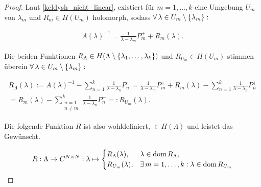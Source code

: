 \begin{proof}

    Laut \ref{keldysh_nicht_linear}, existiert für $m = 1, \dots, k$ eine Umgebung $U_m$ von $\lambda_m$ und $R_m \in H(U_m)$ holomorph, sodass $\forall \, \lambda \in U_m \setminus {\left \{ \lambda_m \right \}}:$

    \begin{align*}
        A(\lambda)^{-1}
        =
        \frac{1}{\lambda - \lambda_m} P_m^+
        +
        R_m(\lambda).
    \end{align*}

    Die beiden Funktionen $R_\Lambda \in H(\Lambda \setminus {\left \{ \lambda_1, \dots, \lambda_k \right \}})$ und $R_{U_m} \in H(U_m)$ stimmen überein $\forall \, \lambda \in U_m \setminus {\left \{ \lambda_m \right \}}:$

    \begin{multline*}
        R_\Lambda(\lambda)
        :=
        A(\lambda)^{-1}
        -
        \sum_{n=1}^k
            \frac{1}{\lambda - \lambda_n} P_n^+
        =
        \frac{1}{\lambda - \lambda_m} P_m^+
        +
        R_m(\lambda)
        -
        \sum_{n=1}^k
            \frac{1}{\lambda - \lambda_n} P_n^+ \\
        =
        R_m(\lambda)
        -
        \sum_{\substack{n = 1 \\ n \neq m}}^k
            \frac{1}{\lambda - \lambda_n} P_n^+
        =:
        R_{U_m}(\lambda).
    \end{multline*}

    Die folgende Funktion $R$ ist also wohldefiniert, $\in H(\Lambda)$ und leistet das Gewünscht.

    \begin{align*}
        R:
        \Lambda \to C^{N \times N}:
        \lambda
        \mapsto
        \begin{cases}
            R_\Lambda(\lambda), & \lambda \in \operatorname{dom} R_\Lambda, \\
            R_{U_m}(\lambda),   & \exists \, m = 1, \dots, k: \lambda \in \operatorname{dom} R_{U_m}
        \end{cases}
    \end{align*}

\end{proof}